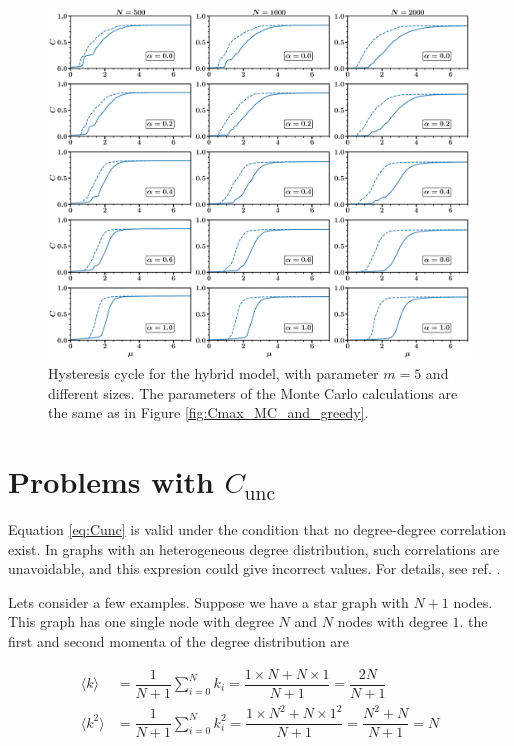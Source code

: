 \documentclass{article}
\begin{document}
\begin{figure}[ht!]
\centering
\includegraphics[scale=0.27]{./figs/Cmax_MC_and_greedy_HM}
\caption{Hysteresis cycle for the hybrid model, with parameter $m = 5$ and different sizes. The parameters of the Monte Carlo calculations are the same as in Figure \ref{fig:Cmax_MC_and_greedy}.}
\label{fig:Cmax_MC_and_greedy_HM}
\end{figure}

\appendix
\section{Problems with $C_{\mathrm{unc}}$} \label{app:Cunc}

Equation \ref{eq:Cunc} is valid under the condition that no degree-degree correlation exist. In graphs with an heterogeneous degree distribution, such correlations are unavoidable, and this expresion could give incorrect values. For details, see ref. \cite{Newman2003WhyNetworks}.

Lets consider a few examples. Suppose we have a star graph with $N+1$ nodes. This graph has one single node with degree $N$ and $N$ nodes with degree $1$. the first and second momenta of the degree distribution are 

\begin{align}
    \langle k \rangle &= \dfrac{1}{N+1} \sum_{i=0}^N k_i = \dfrac{1\times N + N \times 1}{N+1} = \dfrac{2N}{N+1} \nonumber \\
    \langle k^2 \rangle &= \dfrac{1}{N+1} \sum_{i=0}^N k_i^2 = \dfrac{1\times N^2 + N \times 1^2}{N+1} = \dfrac{N^2 + N}{N+1} = N
\end{align}
\end{document}
